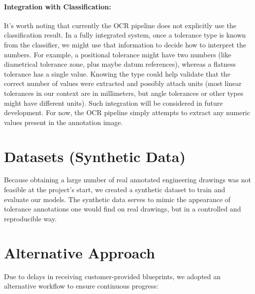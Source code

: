 \documentclass[11pt,a4paper]{article}
\begin{document}
\paragraph{Integration with Classification:} It’s worth noting that currently the OCR pipeline does not explicitly use the classification result. In a fully integrated system, once a tolerance type is known from the classifier, we might use that information to decide how to interpret the numbers. For example, a positional tolerance might have two numbers (like diametrical tolerance zone, plus maybe datum references), whereas a flatness tolerance has a single value. Knowing the type could help validate that the correct number of values were extracted and possibly attach units (most linear tolerances in our context are in millimeters, but angle tolerances or other types might have different units). Such integration will be considered in future development. For now, the OCR pipeline simply attempts to extract any numeric values present in the annotation image.

\section{Datasets (Synthetic Data)}
Because obtaining a large number of real annotated engineering drawings was not feasible at the project’s start, we created a synthetic dataset to train and evaluate our models. The synthetic data serves to mimic the appearance of tolerance annotations one would find on real drawings, but in a controlled and reproducible way.

\section*{Alternative Approach}
Due to delays in receiving customer-provided blueprints, we adopted an alternative workflow to ensure continuous progress:
\end{document}
